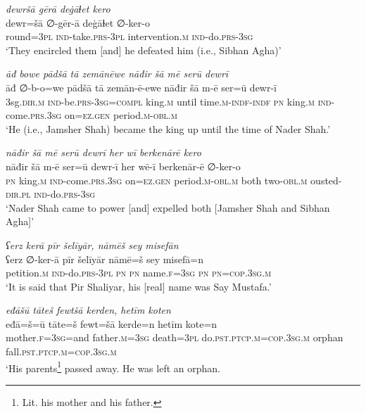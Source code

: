\ea \label{DP.52}
\textit{dewršā gērā deġāɫet kero} \\ 
\gll dewr=šā ∅-gēr-ā deġāɫet ∅-ker-o \\ 
 round\textsc{=3pl} \textsc{ind-}take\textsc{.prs}\textsc{-3pl} intervention\textsc{.m} \textsc{ind-}do\textsc{.prs}\textsc{-3sg} \\ 
\glt `They encircled them [and] he defeated him (i.e., Sibhan Agha)'
\z 
 
\ea \label{DP.53}
\textit{āđ bowe pādšā tā zemānēwe nāđir šā mē serū dewrī} \\ 
\gll āđ ∅-b-o=we pādšā tā zemān-ē-ewe nāđir šā m-ē ser=ū dewr-ī \\ 
 3sg\textsc{.dir}\textsc{.m} \textsc{ind-}be\textsc{.prs}\textsc{-3sg}\textsc{=\textsc{compl}} king\textsc{.m} until time\textsc{.m}\textsc{-indf}\textsc{-indf} \textsc{pn} king\textsc{.m} \textsc{ind-}come\textsc{.prs}\textsc{.3sg} on\textsc{=ez}\textsc{.gen} period\textsc{.m}\textsc{-obl}\textsc{.m} \\ 
\glt `He (i.e., Jamsher Shah) became the king up until the time of Nader Shah.'
\z 
 
\ea \label{DP.54}
\textit{nāđir šā mē serū dewrī her wī berkenārē kero} \\ 
\gll nāđir šā m-ē ser=ū dewr-ī her wē-ī berkenār-ē ∅-ker-o \\ 
 \textsc{pn} king\textsc{.m} \textsc{ind-}come\textsc{.prs}\textsc{.3sg} on\textsc{=ez}\textsc{.gen} period\textsc{.m}\textsc{-obl}\textsc{.m} both two\textsc{-obl}\textsc{.m} ousted\textsc{-dir}\textsc{.pl} \textsc{ind-}do\textsc{.prs}\textsc{-3sg} \\ 
\glt `Nader Shah came to power [and] expelled both [Jamsher Shah and Sibhan Agha]'
\z 
 
\ea \label{ZP.1}
\textit{ʕerz kerā pīr šelīyār, nāmēš sey misefān} \\ 
\gll ʕerz ∅-ker-ā pīr šelīyār nāmē=š sey misefā=n \\ 
 petition\textsc{.m} \textsc{ind-}do\textsc{.prs}\textsc{-3pl} \textsc{pn} \textsc{pn} name\textsc{.f}\textsc{=3sg} \textsc{pn} \textsc{pn}\textsc{=cop}\textsc{.3sg}\textsc{.m} \\ 
\glt `It is said that Pir Shaliyar, his [real] name was Say Mustafa.'
\z 
 
\ea \label{ZP.4}
\textit{eđāšū tāteš fewtšā kerden, hetīm koten} \\ 
\gll eđā=š=ū tāte=š fewt=šā kerde=n hetīm kote=n \\ 
 mother\textsc{.f}\textsc{=3sg}=and father\textsc{.m}\textsc{=3sg} death\textsc{=3pl} do\textsc{.pst}\textsc{.ptcp}\textsc{.m}\textsc{=cop}\textsc{.3sg}\textsc{.m} orphan fall\textsc{.pst}\textsc{.ptcp}\textsc{.m}\textsc{=cop}\textsc{.3sg}\textsc{.m} \\ 
\glt `His parents\footnote{Lit. his mother and his father.} passed away. He was left an orphan.\\ 
\z 

